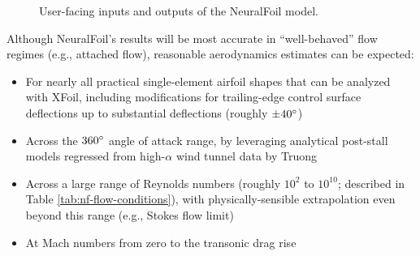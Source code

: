 \begin{figure}[H]
        \caption{User-facing inputs and outputs of the NeuralFoil model.}
        \label{fig:neuralfoil_io}
    \end{figure}

    \noindent Although NeuralFoil's results will be most accurate in ``well-behaved'' flow regimes (e.g., attached flow), reasonable aerodynamics estimates can be expected:
    \begin{itemize}
        \item For nearly all practical single-element airfoil shapes that can be analyzed with XFoil, including modifications for trailing-edge control surface deflections up to substantial deflections (roughly $\pm 40\degree$)
        \item Across the $360\degree$ angle of attack range, by leveraging analytical post-stall models regressed from high-$\alpha$ wind tunnel data by Truong \cite{truong_analytical_2020}
        \item Across a large range of Reynolds numbers (roughly $10^2$ to $10^{10}$; described in Table \ref{tab:nf-flow-conditions}), with physically-sensible extrapolation even beyond this range (e.g., Stokes flow limit)
        \item At Mach numbers from zero to the transonic drag rise
    \end{itemize}


